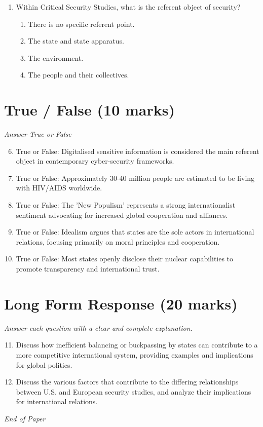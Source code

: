 \documentclass[12pt]{article}
\begin{document}
\begin{enumerate}[label=\arabic*.]
\begin{enumerate}[label=(\alph*)]
    \item the president of the United States.
    \item the secretary of defense.
    \item the chairman of the Joint Chiefs of Staff.
    \item Congress.
\end{enumerate}
\item Within Critical Security Studies, what is the referent object of security?
\begin{enumerate}[label=(\alph*)]
    \item There is no specific referent point.
    \item The state and state apparatus.
    \item The environment.
    \item The people and their collectives.
\end{enumerate}
\end{enumerate}

\section*{True / False (10 marks)}
\textit{Answer True or False}
\begin{enumerate}[label=\arabic*.]
\setcounter{enumi}{5}
\item True or False: Digitalised sensitive information is considered the main referent object in contemporary cyber-security frameworks.
\item True or False: Approximately 30-40 million people are estimated to be living with HIV/AIDS worldwide.
\item True or False: The 'New Populism' represents a strong internationalist sentiment advocating for increased global cooperation and alliances.
\item True or False: Idealism argues that states are the sole actors in international relations, focusing primarily on moral principles and cooperation.
\item True or False: Most states openly disclose their nuclear capabilities to promote transparency and international trust.
\end{enumerate}

\section*{Long Form Response (20 marks)}
\textit{Answer each question with a clear and complete explanation.}
\begin{enumerate}[label=\arabic*.]
\setcounter{enumi}{10}
\item Discuss how inefficient balancing or buckpassing by states can contribute to a more competitive international system, providing examples and implications for global politics.
\item Discuss the various factors that contribute to the differing relationships between U.S. and European security studies, and analyze their implications for international relations.
\end{enumerate}

\vfill
\noindent\textit{End of Paper}
\end{document}
